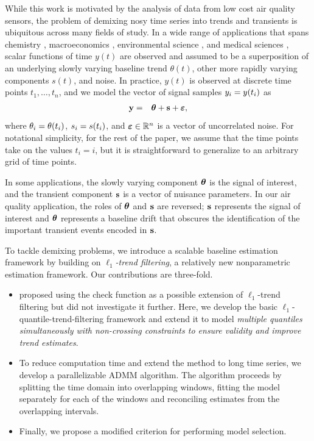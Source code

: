 \documentclass[aoas]{imsart}
\newcommand{\Real}{\mathbb{R}}
\newcommand{\V}[1]{{\bm{\mathbf{\MakeLowercase{#1}}}}} %
\newcommand{\VE}[2]{\MakeLowercase{#1}_{#2}} %
\begin{document}
While this work is motivated by the analysis of data from low cost air quality sensors, the problem of demixing nosy time series into trends and transients is ubiquitous across many fields of study. In a wide range of applications that spans chemistry \citep{Ning2014}, macroeconomics \citep{yamada2017estimating}, environmental science \citep{brantley2014mobile}, and medical sciences \citep{pettersson2013algorithm, marandi2015qualitative}, scalar functions of time $y(t)$ are observed and assumed to be a superposition of an underlying slowly varying baseline trend $\theta(t)$, other more rapidly varying components $s(t)$, and noise. In practice, $y(t)$ is observed at discrete time points $t_1, \ldots, t_n$, and we model the vector of signal samples $\VE{y}{i} = y(t_i)$ as
\begin{eqnarray*}
	\V{y} & = & \V{\theta} + \V{s} + \V{\varepsilon},
\end{eqnarray*}
where $\VE{\theta}{i} = \theta(t_i)$, $\VE{s}{i} = s(t_i)$, and $\V{\varepsilon} \in \Real^n$ is a vector of uncorrelated noise. For notational simplicity, for the rest of the paper, we assume that the time points take on the values $t_i = i$, but it is straightforward to generalize to an arbitrary grid of time points.

In some applications, the slowly varying component $\V{\theta}$ is the signal of interest, and the transient component $\V{s}$ is a vector of nuisance parameters. In our air quality application, the roles of $\V{\theta}$ and $\V{s}$ are reversed; $\V{s}$ represents the signal of interest and $\V{\theta}$ represents a baseline drift that obscures the identification of the important transient events encoded in $\V{s}$. 

To tackle demixing problems, we introduce a scalable baseline estimation framework by building on \textit{$\ell_1$-trend filtering}, a relatively new nonparametric estimation framework. Our contributions are three-fold.
\begin{itemize}
	\item \cite{Kim2009} proposed using the check function as a possible extension of $\ell_1$-trend filtering but did not investigate it further. Here, we develop the basic $\ell_1$-quantile-trend-filtering framework and extend it to model {\em multiple quantiles simultaneously with non-crossing constraints to ensure validity and improve trend estimates}.
	\item To reduce computation time and extend the method to long time series, we develop a parallelizable ADMM algorithm. The algorithm proceeds by splitting the time domain into overlapping windows, fitting the model separately for each of the windows and reconciling estimates from the overlapping intervals.
	\item Finally, we propose a modified criterion for performing model selection.
\end{itemize}
\end{document}
